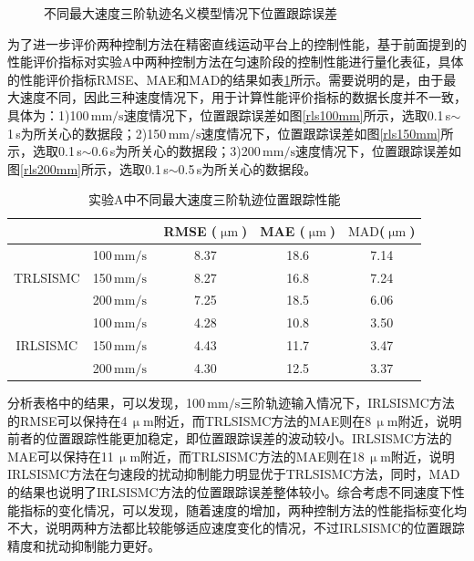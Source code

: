 \begin{figure}[H]
{		\label{rls200mm} }
	\caption{不同最大速度三阶轨迹名义模型情况下位置跟踪误差}\label{不同最大速度三阶S轨迹名义模型情况下位置跟踪误1}
\end{figure}
为了进一步评价两种控制方法在精密直线运动平台上的控制性能，基于前面提到的性能评价指标对实验A中两种控制方法在匀速阶段的控制性能进行量化表征，具体的性能评价指标RMSE、MAE和MAD的结果如表\ref{实验A1}所示。需要说明的是，由于最大速度不同，因此三种速度情况下，用于计算性能评价指标的数据长度并不一致，具体为：1)100$\,\text{mm/s}$速度情况下，位置跟踪误差如图\ref{rls100mm}所示，选取0.1\,s$\sim$1\,s为所关心的数据段；2)150$\,\text{mm/s}$速度情况下，位置跟踪误差如图\ref{rls150mm}所示，选取0.1\,s$\sim$0.6\,s为所关心的数据段；3)200$\,\text{mm/s}$速度情况下，位置跟踪误差如图\ref{rls200mm}所示，选取0.1\,s$\sim$0.5\,s为所关心的数据段。
\begin{table}[H]
	\caption{实验A中不同最大速度三阶轨迹位置跟踪性能}
	\label{实验A1}
	\centering
	\setlength{\tabcolsep}{3mm} 
	\begin{tabular}{ccccc}
		\toprule[1.5pt]
		& \text{参考轨迹} & RMSE ($\text{$\upmu$m}$) & MAE ($\text{$\upmu$m}$) & $\text{MAD}$($\text{$\upmu$m}$)   \\ 
		\midrule
		\multirow{3}{*}{TRLSISMC}     
		& 100\,$\text{mm/s }$        & 8.37      & 18.6 &7.14   \\  
		& 150\,$\text{mm/s }$        & 8.27      & 16.8 &7.24     \\ 
		& 200\,$\text{mm/s }$        & 7.25      & 18.5 &6.06     \\
		\midrule
		\multirow{3}{*}{IRLSISMC} 
		& 100\,$\text{mm/s }$        & 4.28      & 10.8 &3.50  \\  
		& 150\,$\text{mm/s }$        & 4.43      & 11.7 &3.47     \\ 
		& 200\,$\text{mm/s }$        & 4.30      & 12.5 &3.37     \\
		\bottomrule[1.5pt]
	\end{tabular}
\end{table}

分析表格中的结果，可以发现，100\,$\text{mm/s}$三阶轨迹输入情况下，IRLSISMC方法的RMSE可以保持在4\,$\upmu$$\text{m}$附近，而TRLSISMC方法的MAE则在8\,$\upmu$$\text{m}$附近，说明前者的位置跟踪性能更加稳定，即位置跟踪误差的波动较小。IRLSISMC方法的MAE可以保持在11\,$\upmu$$\text{m}$附近，而TRLSISMC方法的MAE则在18\,$\upmu$$\text{m}$附近，说明IRLSISMC方法在匀速段的扰动抑制能力明显优于TRLSISMC方法，同时，MAD的结果也说明了IRLSISMC方法的位置跟踪误差整体较小。综合考虑不同速度下性能指标的变化情况，可以发现，随着速度的增加，两种控制方法的性能指标变化均不大，说明两种方法都比较能够适应速度变化的情况，不过IRLSISMC的位置跟踪精度和扰动抑制能力更好。

